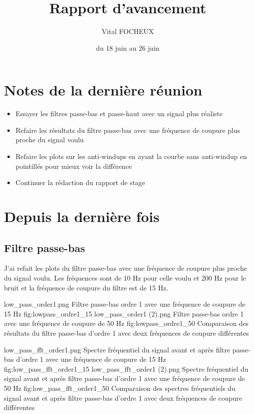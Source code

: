 \documentclass{article}
\title{Rapport d'avancement}
\author{Vital FOCHEUX}
\date{du 18 juin au 26 juin}
\begin{document}
\maketitle

\section{Notes de la dernière réunion}

\begin{itemize}
    \item Essayer les filtres passe-bas et passe-haut avec un signal plus réaliste
    \item Refaire les résultats du filtre passe-bas avec une fréquence de coupure plus proche du signal voulu
    \item Refaire les plots sur les anti-windups en ayant la courbe sans anti-windup en pointillés pour mieux voir la différence
    \item Continuer la rédaction du rapport de stage
\end{itemize}

\section{Depuis la dernière fois}

\subsection{Filtre passe-bas}

J'ai refait les plots du filtre passe-bas avec une fréquence de coupure plus proche du signal voulu.
Les fréquences sont de 10 Hz pour celle voulu et 200 Hz pour le bruit et la fréquence de coupure du 
filtre est de 15 Hz.

\DoubleFigure
    {low_pass_order1.png}
    {Filtre passe-bas ordre 1 avec une fréquence de coupure de 15 Hz}
    {fig:lowpass_ordre1_15}
    {low_pass_order1 (2).png}
    {Filtre passe-bas ordre 1 avec une fréquence de coupure de 50 Hz}
    {fig:lowpass_ordre1_50}
    {Comparaison des résultats du filtre passe-bas d'ordre 1 avec deux fréquences de coupure différentes}

\DoubleFigure
    {low_pass_fft_order1.png}
    {Spectre fréquentiel du signal avant et après filtre passe-bas d'ordre 1 avec une fréquence de coupure de 15 Hz}
    {fig:low_pass_fft_order1_15}
    {low_pass_fft_order1 (2).png}
    {Spectre fréquentiel du signal avant et après filtre passe-bas d'ordre 1 avec une fréquence de coupure de 50 Hz}
    {fig:low_pass_fft_order1_50}
    {Comparaison des spectres fréquentiels du signal avant et après filtre passe-bas d'ordre 1 avec deux fréquences de coupure différentes}
\end{document}
